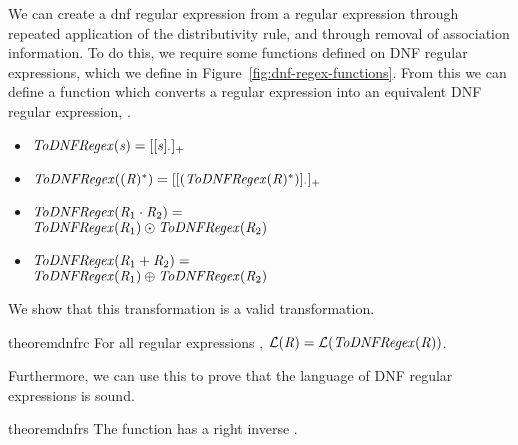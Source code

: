 
We can create a dnf regular expression from a regular expression through repeated
application of the distributivity rule, and through removal of association information.  To do this, we require some functions defined on DNF regular expressions,
which we define in Figure~\ref{fig:dnf-regex-functions}.
From this we can define a function which converts a regular expression into
an equivalent DNF regular expression, \ToDNFRegex{}.
\begin{definition}
\leavevmode
\begin{itemize}
\item $\mathit{ToDNFRegex}(\mathit{s})=[[\mathit{s}]_{\cdot}]_{+}$
\item $\mathit{ToDNFRegex}((\mathit{R})^*) = [[(\mathit{ToDNFRegex}(\mathit{R})^*)]_{\cdot}]_{+}$
\item $\mathit{ToDNFRegex}(\mathit{R}_1\cdot\mathit{R}_2) =$\\
\hspace*{1em}$\mathit{ToDNFRegex}(\mathit{R}_1)\odot\mathit{ToDNFRegex}(\mathit{R}_2)$
\item $\mathit{ToDNFRegex}(\mathit{R}_1+\mathit{R}_2) =$\\
\hspace*{1em}$\mathit{ToDNFRegex}(\mathit{R}_1)\oplus\mathit{ToDNFRegex}(\mathit{R}_2)$
\end{itemize}
\end{definition}
We show that this transformation is a valid transformation.
\begin{restatable}{theorem}{dnfrc}
\label{thm:completeness-dnf-lenses}
For all regular expressions \Regex{},
$\mathcal{L}(\mathit{R})=\mathcal{L}(\mathit{ToDNFRegex}(\mathit{R}))$.
\end{restatable}

Furthermore, we can use this to prove that the language of DNF regular expressions is sound.

\begin{restatable}{theorem}{dnfrs}
\label{thm:soundness-dnf-lenses}
The function \ToDNFRegex{} has a right inverse \FromDNFRegex{}.
\end{restatable}

